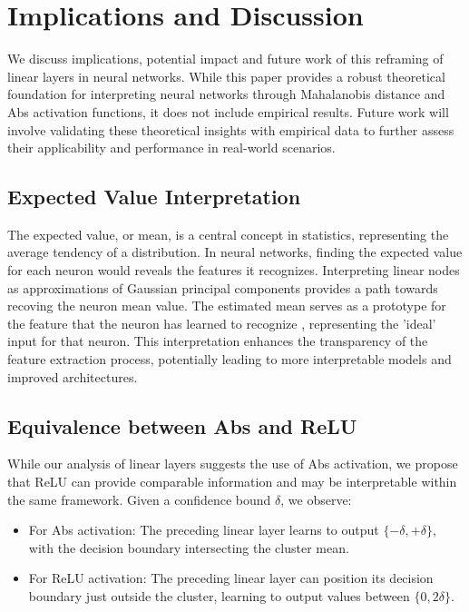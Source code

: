 
\section{Implications and Discussion}
\label{sec:discussion}

We discuss implications, potential impact and future work of this reframing of linear layers in neural networks. While this paper provides a robust theoretical foundation for interpreting neural networks through Mahalanobis distance and Abs activation functions, it does not include empirical results. Future work will involve validating these theoretical insights with empirical data to further assess their applicability and performance in real-world scenarios.

\subsection{Expected Value Interpretation}

The expected value, or mean, is a central concept in statistics, representing the average tendency of a distribution. In neural networks, finding the expected value for each neuron would reveals the features it recognizes. Interpreting linear nodes as approximations of Gaussian principal components  provides a path towards recoving the neuron mean value. The estimated mean serves as a prototype for the feature that the neuron has learned to recognize \citep{li2018deep}, representing the 'ideal' input for that neuron. This interpretation enhances the transparency of the feature extraction process, potentially leading to more interpretable models and improved architectures.

\subsection{Equivalence between Abs and ReLU}

While our analysis of linear layers suggests the use of Abs activation, we propose that ReLU can provide comparable information and may be interpretable within the same framework. Given a confidence bound $\delta$, we observe:

\begin{itemize}
    \item For Abs activation: The preceding linear layer learns to output $\{-\delta, +\delta\}$, with the decision boundary intersecting the cluster mean.
    \item For ReLU activation: The preceding linear layer can position its decision boundary just outside the cluster, learning to output values between $\{0, 2\delta\}$.
\end{itemize}

